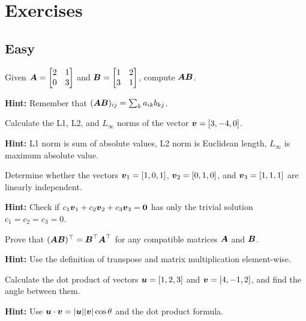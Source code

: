 
\section*{Exercises}

\subsection*{Easy}

\begin{problem}
Given $\boldsymbol{A} = \begin{bmatrix} 2 & 1 \\ 0 & 3 \end{bmatrix}$ and $\boldsymbol{B} = \begin{bmatrix} 1 & 2 \\ 3 & 1 \end{bmatrix}$, compute $\boldsymbol{A}\boldsymbol{B}$.

\textbf{Hint:} Remember that $(\boldsymbol{A}\boldsymbol{B})_{ij} = \sum_k a_{ik}b_{kj}$.
\end{problem}

\begin{problem}
Calculate the L1, L2, and $L_\infty$ norms of the vector $\boldsymbol{v} = [3, -4, 0]$.

\textbf{Hint:} L1 norm is sum of absolute values, L2 norm is Euclidean length, $L_\infty$ is maximum absolute value.
\end{problem}

\begin{problem}
Determine whether the vectors $\boldsymbol{v}_1 = [1, 0, 1]$, $\boldsymbol{v}_2 = [0, 1, 0]$, and $\boldsymbol{v}_3 = [1, 1, 1]$ are linearly independent.

\textbf{Hint:} Check if $c_1\boldsymbol{v}_1 + c_2\boldsymbol{v}_2 + c_3\boldsymbol{v}_3 = \boldsymbol{0}$ has only the trivial solution $c_1 = c_2 = c_3 = 0$.
\end{problem}

\begin{problem}
Prove that $(\boldsymbol{A}\boldsymbol{B})^\top = \boldsymbol{B}^\top\boldsymbol{A}^\top$ for any compatible matrices $\boldsymbol{A}$ and $\boldsymbol{B}$.

\textbf{Hint:} Use the definition of transpose and matrix multiplication element-wise.
\end{problem}

\begin{problem}
Calculate the dot product of vectors $\boldsymbol{u} = [1, 2, 3]$ and $\boldsymbol{v} = [4, -1, 2]$, and find the angle between them.

\textbf{Hint:} Use $\boldsymbol{u} \cdot \boldsymbol{v} = |\boldsymbol{u}||\boldsymbol{v}|\cos\theta$ and the dot product formula.
\end{problem}

